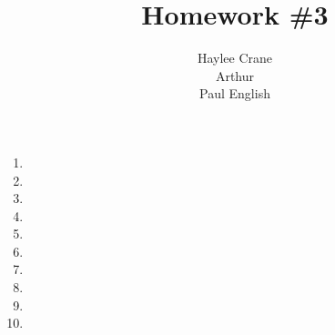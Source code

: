 \documentclass[11pt, oneside]{article}
\title{Homework \#3}
\author{
Haylee Crane \\
Arthur \\ %
Paul English
}
\begin{document}
\maketitle

\begin{enumerate}

\item 
\item 
\item 
\item 
\item 
\item 
\item 
\item 
\item 
\item 

\end{enumerate}
\end{document}
